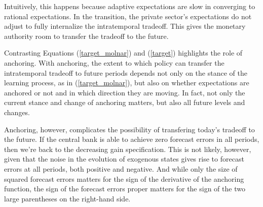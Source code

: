 \documentclass[11pt]{article}
\renewcommand{\[}{\begin{equation}}
\renewcommand{\]}{\end{equation}}
\begin{document}
Intuitively, this happens because adaptive expectations are slow in converging to rational expectations. In the transition, the private sector's expectations do not adjust to fully internalize the intratemporal tradeoff. This gives the monetary authority room to transfer the tradeoff to the future.

Contrasting Equations (\ref{target_molnar}) and (\ref{target}) highlights the role of anchoring. With anchoring, the extent to which policy can transfer the intratemporal tradeoff to future periods depends not only on the stance of the learning process, as in (\ref{target_molnar}), but also on whether expectations are anchored or not and in which direction they are moving. In fact, not only the current stance and change of anchoring matters, but also all future levels and changes. 

Anchoring, however, complicates the possibility of transfering today's tradeoff to the future. If the central bank is able to achieve zero forecast errors in all periods, then we're back to the decreasing gain specification. This is not likely, however, given that the noise in the evolution of exogenous states gives rise to forecast errors at all periods, both positive and negative. And while only the size of squared forecast errors matters for the sign of the derivative of the anchoring function, the sign of the forecast errors proper matters for the sign of the two large parentheses on the right-hand side. 
\end{document}
